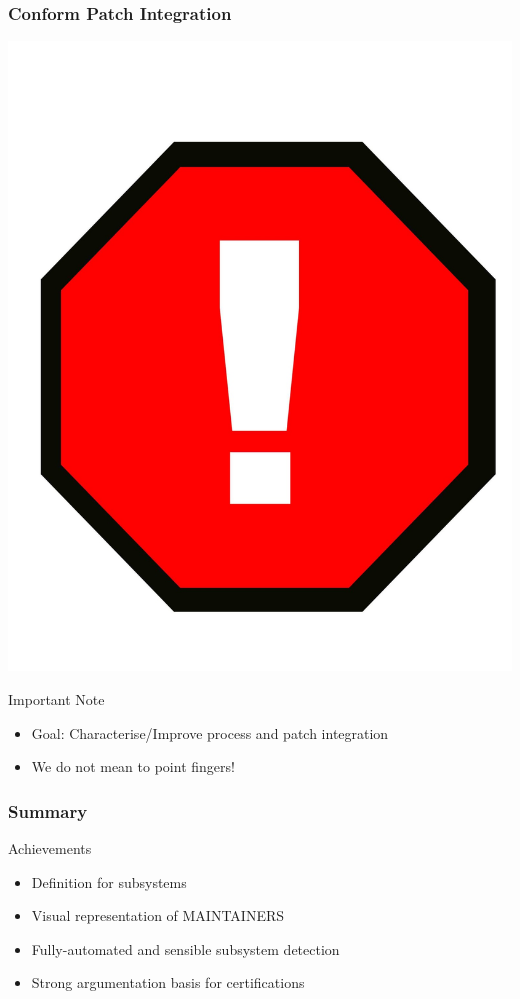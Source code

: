 \documentclass{beamer}
\begin{document}
	\begin{frame}
	\frametitle{Conform Patch Integration}
	\begin{center}
	\includegraphics[scale=0.05]{pics/exclamation.jpeg}
	\end{center}

		\begin{alertblock}{Important Note}
			\begin{itemize}
				\item Goal: Characterise/Improve process and patch integration %
				\item We do not mean to point fingers!
			\end{itemize}
		\end{alertblock}
	\end{frame}


	\begin{frame}
	\frametitle{Summary}
		\begin{block}{Achievements}
			\begin{itemize}
				\item Definition for subsystems
				\item Visual representation of MAINTAINERS
				\item Fully-automated and sensible subsystem detection
				\item Strong argumentation basis for certifications
			\end{itemize}
		\end{block}
	\end{frame}
\end{document}
